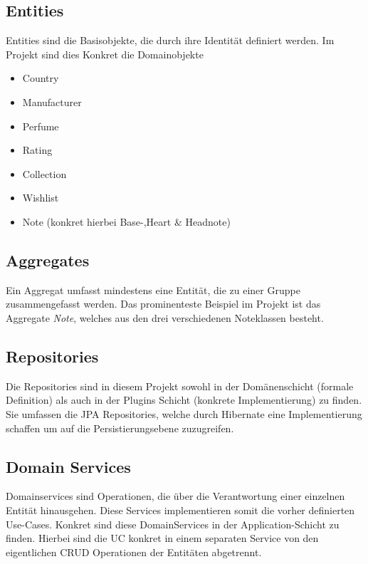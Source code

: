 		\subsection{Entities}
		Entities sind die Basisobjekte, die durch ihre Identität definiert werden. Im Projekt sind dies Konkret die Domainobjekte
		\begin{itemize}
			\item Country
			\item Manufacturer
			\item Perfume
			\item Rating
			\item Collection
			\item Wishlist
			\item Note (konkret hierbei Base-,Heart \& Headnote)
		\end{itemize}
	
		\subsection{Aggregates}
		Ein Aggregat umfasst mindestens eine Entität, die zu einer Gruppe zusammengefasst werden. Das prominenteste Beispiel im Projekt ist das Aggregate \textit{Note}, welches aus den drei verschiedenen Noteklassen besteht.
	
		\subsection{Repositories}
		Die Repositories sind in diesem Projekt sowohl in der Domänenschicht (formale Definition) als auch in der Plugins Schicht (konkrete Implementierung) zu finden. Sie umfassen die JPA Repositories, welche durch Hibernate eine Implementierung schaffen um auf die Persistierungsebene zuzugreifen.
	
		\subsection{Domain Services}
		Domainservices sind Operationen, die über die Verantwortung einer einzelnen Entität hinausgehen. Diese Services implementieren somit die vorher definierten Use-Cases. Konkret sind diese DomainServices in der Application-Schicht zu finden. Hierbei sind die UC konkret in einem separaten Service von den eigentlichen CRUD Operationen der Entitäten abgetrennt.
		